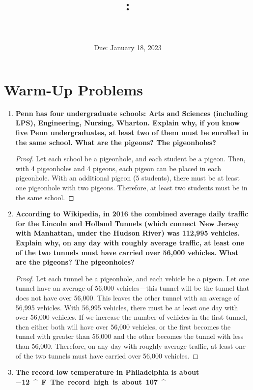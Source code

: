 \documentclass[article, 12pt]{article}
\title{
    \vspace{2in}
    \textmd{\textbf{\courseNumber: \courseName}}
    \normalsize\vspace{0.1in}\\
    \vspace{0.1in}\Large{\text{\psetName}} \\
    \vspace{0.1in}\large{\text{\professor}}
    \vspace{3in}
}
\author{\name}
\date{Due: January 18, 2023}
\theoremstyle{definition}
\newcommand{\degree}{^\circ}
\begin{document}
    \maketitle
    \thispagestyle{empty}
    \pagebreak

    \section{Warm-Up Problems}
    \begin{enumerate}[(1)]
        \item \textbf{Penn has four undergraduate schools: Arts and Sciences (including LPS), Engineering,
        Nursing, Wharton. Explain why, if you know five Penn undergraduates, at least two of
        them must be enrolled in the same school. What are the pigeons? The pigeonholes?}
        \begin{proof}
            Let each school be a pigeonhole, and each student be a pigeon. Then, with 4 pigeonholes and 4 pigeons, each pigeon can be placed in each pigeonhole. With an additional pigeon (5 students), there must be at least one pigeonhole with two pigeons. Therefore, at least two students must be in the same school.
        \end{proof}
        \item \textbf{According to Wikipedia, in 2016 the combined average daily traffic for the Lincoln and
        Holland Tunnels (which connect New Jersey with Manhattan, under the Hudson River)
        was 112,995 vehicles. Explain why, on any day with roughly average traffic, at least one
        of the two tunnels must have carried over 56,000 vehicles. What are the pigeons? The
        pigeonholes?}
        \begin{proof}
            Let each tunnel be a pigeonhole, and each vehicle be a pigeon. Let one tunnel have an average of 56,000 vehicles---this tunnel will be the tunnel that does not have over 56,000. This leaves the other tunnel with an average of 56,995 vehicles. With 56,995 vehicles, there must be at least one day with over 56,000 vehicles. If we increase the number of vehicles in the first tunnel, then either both will have over 56,000 vehicles, or the first becomes the tunnel with greater than 56,000 and the other becomes the tunnel with less than 56,000. Therefore, on any day with roughly average traffic, at least one of the two tunnels must have carried over 56,000 vehicles.
        \end{proof}
        \item \textbf{The record low temperature in Philadelphia is about \SI{-12}{\degree} F. The record high is about \SI{107}{\degree}
}
\end{enumerate}
\end{document}

